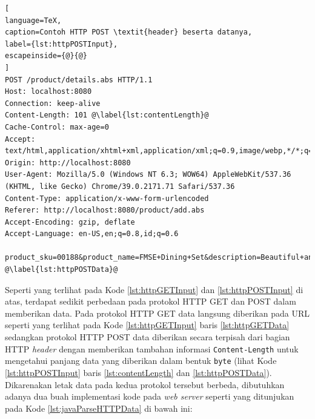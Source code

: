 \begin{lstlisting}[
language=TeX,
caption=Contoh HTTP POST \textit{header} beserta datanya,
label={lst:httpPOSTInput},
escapeinside={@}{@}
]
POST /product/details.abs HTTP/1.1
Host: localhost:8080
Connection: keep-alive
Content-Length: 101 @\label{lst:contentLength}@
Cache-Control: max-age=0
Accept: text/html,application/xhtml+xml,application/xml;q=0.9,image/webp,*/*;q=0.8
Origin: http://localhost:8080
User-Agent: Mozilla/5.0 (Windows NT 6.3; WOW64) AppleWebKit/537.36 (KHTML, like Gecko) Chrome/39.0.2171.71 Safari/537.36
Content-Type: application/x-www-form-urlencoded
Referer: http://localhost:8080/product/add.abs
Accept-Encoding: gzip, deflate
Accept-Language: en-US,en;q=0.8,id;q=0.6

product_sku=00188&product_name=FMSE+Dining+Set&description=Beautiful+and+Cute+Dining+Set&price=250000 @\label{lst:httpPOSTData}@
\end{lstlisting}

Seperti yang terlihat pada Kode \ref{lst:httpGETInput} dan \ref{lst:httpPOSTInput} di atas, terdapat sedikit perbedaan pada protokol HTTP GET dan POST dalam memberikan data. Pada protokol HTTP GET data langsung diberikan pada URL seperti yang terlihat pada Kode \ref{lst:httpGETInput} baris \ref{lst:httpGETData} sedangkan protokol HTTP POST data diberikan secara terpisah dari bagian HTTP \textit{header} dengan memberikan tambahan informasi \texttt{Content-Length} untuk mengetahui panjang data yang diberikan dalam bentuk \texttt{byte} (lihat Kode \ref{lst:httpPOSTInput} baris \ref{lst:contentLength} dan \ref{lst:httpPOSTData}). Dikarenakan letak data pada kedua protokol tersebut berbeda, dibutuhkan adanya dua buah implementasi kode pada \textit{web server} seperti yang ditunjukan pada Kode \ref{lst:javaParseHTTPData} di bawah ini:


